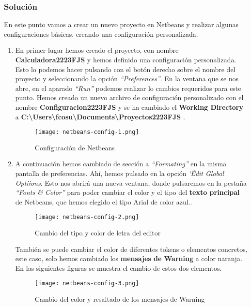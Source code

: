 \subsubsection{Solución}
En este punto vamos a crear un nuevo proyecto en Netbeans y realizar algunas configuraciones básicas, creando una configuración personalizada.

\begin{enumerate}[label=(\alph*)]
    \item En primer lugar hemos creado el proyecto, con nombre \textbf{Calculadora2223FJS} y hemos definido una configuración personalizada. Esto lo podemos hacer pulsando con el botón derecho sobre el nombre del proyecto y seleccionando la opción \textit{``Preferences''}. En la ventana que se nos abre, en el aparado \textit{``Run''} podemos realizar lo cambios requeridos para este punto. Hemos creado un nuevo archivo de configuración personalizado con el nombre \textbf{Configuracion2223FJS} y se ha cambiado el \textbf{Working Directory} a \textbf{C:\textbackslash Users\textbackslash fcosu\textbackslash Documents\textbackslash Proyectos2223FJS }.

    \begin{figure}[ht]
        \centering
        \texttt{[image: netbeans-config-1.png]}
        \caption{Configuración de Netbeans}
    \end{figure}

    \item A continuación hemos cambiado de sección a \textit{``Formating''} en la misma pantalla de preferencias. Ahí, hemos pulsado en la opción \textit{`Èdit Global Optiions}. Esto nos abrirá una nueva ventana, donde pulsaremos en la pestaña \textit{``Fonts \& Color''} para poder cambiar el color y el tipo del \textbf{texto principal} de Netbeans, que hemos elegido el tipo Arial de color azul..

     \begin{figure}[ht]
        \centering
        \texttt{[image: netbeans-config-2.png]}
        \caption{Cambio del tipo y color de letra del editor}
    \end{figure}

     También se puede cambiar el color de diferentes tokens o elementos concretos, este caso, solo hemos cambiado los \textbf{mensajes de Warning} a color naranja. En las siguientes figuras se muestra el cambio de estos dos elementos.

   \begin{figure}[ht]
       \centering
       \texttt{[image: netbeans-config-3.png]}
       \caption{Cambio del color y resaltado de los mensajes de Warning}
    \end{figure}
\end{enumerate}







\newpage



